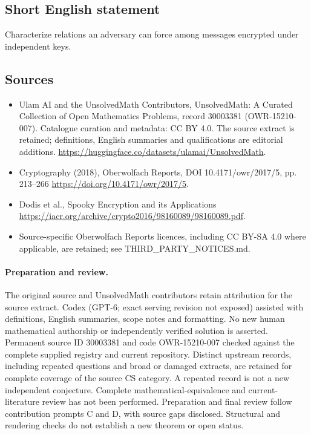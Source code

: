 \documentclass[11pt]{article}
\begin{document}
\subsection{Short English statement}
Characterize relations an adversary can force among messages encrypted under independent keys.
\subsection{Sources}
\begin{itemize}
\item[\hypertarget{source:30003381:1}{S1}] Ulam AI and the UnsolvedMath Contributors, UnsolvedMath: A Curated Collection of Open Mathematics Problems, record 30003381 (OWR-15210-007). Catalogue curation and metadata: CC BY 4.0. The source extract is retained; definitions, English summaries and qualifications are editorial additions.
\url{https://huggingface.co/datasets/ulamai/UnsolvedMath}.
\item[\hypertarget{source:30003381:2}{S2}] Cryptography (2018), Oberwolfach Reports, DOI 10.4171/owr/2017/5, pp. 213--266
\url{https://doi.org/10.4171/owr/2017/5}.
\item[\hypertarget{source:30003381:3}{S3}] Dodis et al., Spooky Encryption and its Applications
\url{https://iacr.org/archive/crypto2016/98160089/98160089.pdf}.
\item Source-specific Oberwolfach Reports licences, including CC BY-SA 4.0 where applicable, are retained; see THIRD\_PARTY\_NOTICES.md.
\end{itemize}
\paragraph{Preparation and review.}
The original source and UnsolvedMath contributors retain attribution for the source extract. Codex (GPT-6; exact serving revision not exposed) assisted with definitions, English summaries, scope notes and formatting. No new human mathematical authorship or independently verified solution is asserted. Permanent source ID 30003381 and code OWR-15210-007 checked against the complete supplied registry and current repository. Distinct upstream records, including repeated questions and broad or damaged extracts, are retained for complete coverage of the source CS category. A repeated record is not a new independent conjecture. Complete mathematical-equivalence and current-literature review has not been performed. Preparation and final review follow contribution prompts C and D, with source gaps disclosed. Structural and rendering checks do not establish a new theorem or open status.
\label{end:30003381}
\end{document}
